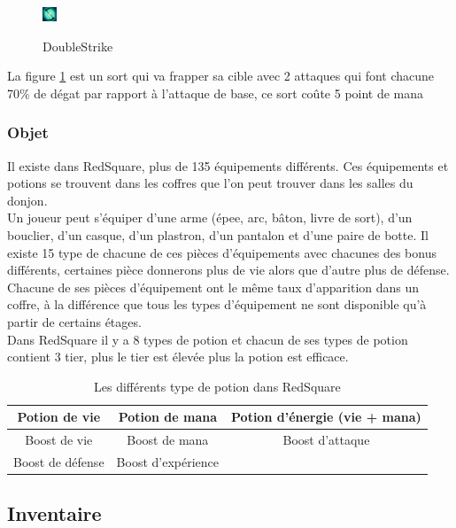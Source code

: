 \documentclass[a4paper, 12pt]{article}
\begin{document}
\begin{figure}[h]
\center
\includegraphics[scale=7]{./Spell/DoubleStrike1} \\
\caption{DoubleStrike}
\label{fig:DoubleStrike}
\end{figure}

La figure \ref{fig:DoubleStrike} est un sort qui va frapper sa cible avec 2 attaques qui font chacune 70\% de dégat par rapport à l'attaque de base, ce sort coûte 5 point de mana\\

\subsubsection*{Objet}
Il existe dans RedSquare, plus de 135 équipements différents. Ces équipements et potions se trouvent dans les coffres que l'on peut trouver dans les salles du donjon. \\
Un joueur peut s'équiper d'une arme (épee, arc, bâton, livre de sort), d'un bouclier, d'un casque, d'un plastron, d'un pantalon et d'une paire de botte.
Il existe 15 type de chacune de ces pièces d'équipements avec chacunes des bonus différents, certaines pièce donnerons plus de vie alors que d'autre plus de défense.\\
Chacune de ses pièces d'équipement ont le même taux d'apparition dans un coffre, à la différence que tous les types d'équipement ne sont disponible qu'à partir de certains étages.
\\
Dans RedSquare il y a 8 types de potion et chacun de ses types de potion contient 3 tier, plus le tier est élevée plus la potion est efficace.\\
\begin{table}[h]
    \begin{tabular}{  | c | c | c | }
        \hline
        Potion de vie & Potion de mana & Potion d'énergie (vie + mana)\\
        \hline
        Boost de vie & Boost de mana & Boost d'attaque\\
        \hline
        Boost de défense & Boost d'expérience &\\
        \hline
    \end{tabular}
    \caption{Les différents type de potion dans RedSquare}
\end{table}

\subsection*{Inventaire}
\end{document}
